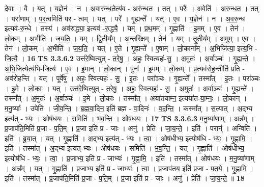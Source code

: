 \documentclass[17pt]{extarticle}
\begin{document}
                  दे॒वाः । वै । यत् । य॒ज्ञेन॑ । न । अ॒वारु॑न्ध॒तेत्य॑व - अरु॑न्धत । तत् । परैः᳚ । अवेति॑ । अ॒रु॒न्ध॒त॒ । तत् । परा॑णाम् । प॒र॒त्वमिति॑ पर - त्वम् । यत् । परे᳚ । गृ॒ह्यन्ते᳚ । यत् । ए॒व । य॒ज्ञेन॑ । न । अ॒व॒रु॒न्ध इत्यव॑-रु॒न्धे । तस्य॑ । अव॑रुद्ध्या॒ इत्यव॑ -रु॒द्ध्यै॒ । यम् । प्र॒थ॒मम् । गृ॒ह्णाति॑ । इ॒मम् । ए॒व । तेन॑ । लो॒कम् । अ॒भीति॑ । ज॒य॒ति॒ । यम् । द्वि॒तीय᳚म् । अ॒न्तरि॑क्षम् । तेन॑ । यम् । तृ॒तीय᳚म् । अ॒मुम् । ए॒व । तेन॑ । लो॒कम् । अ॒भीति॑ । ज॒य॒ति॒ । यत् । ए॒ते । गृ॒ह्यन्ते᳚ । ए॒षाम् । लो॒काना᳚म् । अ॒भिजि॑त्या॒ इत्य॒भि - जि॒त्यै॒ । \textbf{  16} \newline
                  \newline
                                \textbf{ TS 3.3.6.2} \newline
                  उत्त॑रे॒ष्वित्युत् - त॒रे॒षु॒ । अहः॒ स्वित्यहः॑-सु॒ । अ॒मुतः॑ । अ॒र्वाञ्चः॑ । गृ॒ह्य॒न्ते॒ । अ॒भि॒जित्येत्य॑भि-जित्य॑ । ए॒व । इ॒मान् । लो॒कान् । पुनः॑ । इ॒मम् । लो॒कम् । प्र॒त्यव॑रोह॒न्तीति॑ प्रति - अव॑रोहन्ति । यत् । पूर्वे॑षु । अहः॒ स्वित्यहः॑ - सु॒ । इ॒तः । परा᳚ञ्चः । गृ॒ह्यन्ते᳚ । तस्मा᳚त् । इ॒तः । परा᳚ञ्चः । इ॒मे । लो॒काः । यत् । उत्त॑रे॒ष्वित्युत् - त॒रे॒षु॒ । अहः॒ स्वित्यहः॑ - सु॒ । अ॒मुतः॑ । अ॒र्वाञ्चः॑ । गृ॒ह्यन्ते᳚ । तस्मा᳚त् । अ॒मुतः॑ । अ॒र्वाञ्चः॑ । इ॒मे । लो॒काः । तस्मा᳚त् । अया॑तयाम्न॒ इत्यया॑त-या॒म्नः॒ । लो॒कान् । म॒नु॒ष्याः᳚ । उपेति॑ । जी॒व॒न्ति॒ । ब्र॒ह्म॒वा॒दिन॒ इति॑ ब्रह्म - वा॒दिनः॑ । व॒द॒न्ति॒ । कस्मा᳚त् । स॒त्यात् । अ॒द्भ्य इत्य॑त् - भ्यः । ओष॑धयः । समिति॑ । भ॒व॒न्ति॒ । ओष॑धयः । \textbf{  17} \newline
                  \newline
                                \textbf{ TS 3.3.6.3} \newline
                  म॒नु॒ष्या॑णाम् । अन्न᳚म् । प्र॒जाप॑ति॒मिति॑ प्र॒जा - प॒ति॒म् । प्र॒जा इति॑ प्र - जाः । अनु॑ । प्रेति॑ । जा॒य॒न्ते॒ । इति॑ । परान्॑ । अन्विति॑ । इति॑ । ब्रू॒या॒त् । यत् । गृ॒ह्णाति॑ । अ॒द्भ्य इत्य॑त् - भ्यः । त्वा॒ । ओष॑धीभ्य॒ इत्योष॑धि - भ्यः॒ । गृ॒ह्णा॒मि॒ । इति॑ । तस्मा᳚त् । अ॒द्भ्य इत्य॑त्-भ्यः । ओष॑धयः । समिति॑ । भ॒व॒न्ति॒ । यत् । गृ॒ह्णाति॑ । ओष॑धीभ्य॒ इत्योष॑धि - भ्यः॒ । त्वा॒ । प्र॒जाभ्य॒ इति॑ प्र - जाभ्यः॑ । गृ॒ह्णा॒मि॒ । इति॑ । तस्मा᳚त् । ओष॑धयः । म॒नु॒ष्या॑णाम् । अन्न᳚म् । यत् । गृ॒ह्णाति॑ । प्र॒जाभ्य॒ इति॑ प्र - जाभ्यः॑ । त्वा॒ । प्र॒जाप॑तय॒ इति॑ प्र॒जा - प॒त॒ये॒ । गृ॒ह्णा॒मि॒ । इति॑ । तस्मा᳚त् । प्र॒जाप॑ति॒मिति॑ प्र॒जा - प॒ति॒म् । प्र॒जा इति॑ प्र - जाः । अनु॑ । प्रेति॑ । जा॒य॒न्ते॒ ॥ \textbf{  18} \newline
                  \newline
\end{document}
